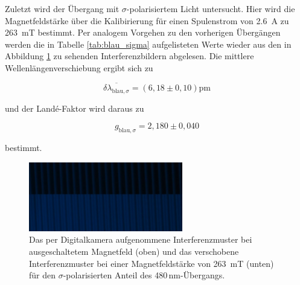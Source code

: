               Zuletzt wird der Übergang mit $\sigma$-polarisiertem Licht untersucht. Hier wird die Magnetfeldstärke über die Kalibirierung für einen Spulenstrom von \SI{2.6}{\ampere} 
              zu \SI{263}{\milli\tesla} bestimmt. Per analogem Vorgehen zu den vorherigen Übergängen werden die in Tabelle \ref{tab:blau_sigma} aufgelisteten Werte wieder aus
              den in Abbildung \ref{fig:blau_sigma} zu sehenden Interferenzbildern abgelesen. Die mittlere Wellenlängenverschiebung ergibt sich zu

            \begin{equation*}
              \overline{\delta \lambda_{\text{blau}, \sigma}} = \left(6,18 \pm 0,10\right)\si{\pico\metre}
            \end{equation*}

            und der Landé-Faktor wird daraus zu

            \begin{equation*}
              g_{\text{blau}, \sigma} = 2,180 \pm 0,040 
            \end{equation*}

            bestimmt.



              \FloatBarrier

              \begin{figure}[h]
                \centering
                \includegraphics[width = 0.6\textwidth]{pictures/blau_sigma.jpg}
                \caption{Das per Digitalkamera aufgenommene Interferenzmuster bei ausgeschaltetem Magnetfeld (oben) und das verschobene Interferenzmuster bei einer Magnetfeldstärke von \SI{263}{\milli\tesla} (unten) für den $\sigma$-polarisierten Anteil des 480\,nm-Übergangs.}
                \label{fig:blau_sigma}
              \end{figure}
          
              \FloatBarrier

